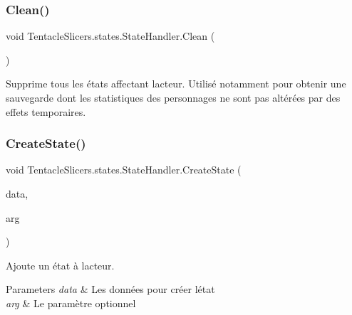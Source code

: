 \subsubsection{\texorpdfstring{Clean()}{Clean()}}
{\footnotesize\ttfamily void Tentacle\+Slicers.\+states.\+State\+Handler.\+Clean (\begin{DoxyParamCaption}{ }\end{DoxyParamCaption})}



Supprime tous les états affectant l\textquotesingle{}acteur. Utilisé notamment pour obtenir une sauvegarde dont les statistiques des personnages ne sont pas altérées par des effets temporaires. 

\mbox{\label{class_tentacle_slicers_1_1states_1_1_state_handler_a9d6aca1bba00b52d21010fa2df0a0397}} 
\subsubsection{\texorpdfstring{Create\+State()}{CreateState()}}
{\footnotesize\ttfamily void Tentacle\+Slicers.\+states.\+State\+Handler.\+Create\+State (\begin{DoxyParamCaption}\item[{\hyperlink{class_tentacle_slicers_1_1states_1_1_state_data}{State\+Data}}]{data,  }\item[{object}]{arg }\end{DoxyParamCaption})}



Ajoute un état à l\textquotesingle{}acteur. 


\begin{DoxyParams}{Parameters}
{\em data} & Les données pour créer l\textquotesingle{}état \\
\hline
{\em arg} & Le paramètre optionnel \\
\hline
\end{DoxyParams}
\mbox{\label{class_tentacle_slicers_1_1states_1_1_state_handler_a8100343390de602cffcdcc3f8adeca17}} 
